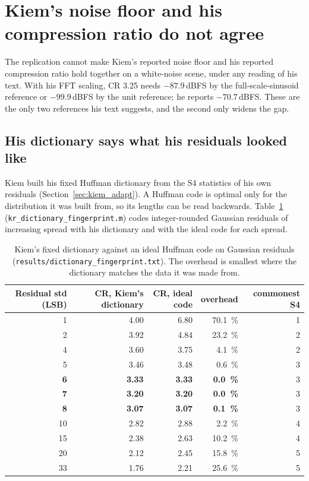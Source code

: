 \section{Kiem's noise floor and his compression ratio do not agree}
\label{sec:kr_nfcr}

The replication cannot make Kiem's reported noise floor and his reported
compression ratio hold together on a white-noise scene, under any reading of
his text. With his FFT scaling, CR 3.25 needs $-87.9$\,dBFS by the
full-scale-sinusoid reference or $-99.9$\,dBFS by the unit reference; he
reports $-70.7$\,dBFS. These are the only two references his text suggests, and
the second only widens the gap.

\subsection{His dictionary says what his residuals looked like}
\label{sec:kr_fingerprint}

Kiem built his fixed Huffman dictionary from the S4 statistics of his own
residuals (Section~\ref{sec:kiem_adapt}). A Huffman code is optimal only for
the distribution it was built from, so its lengths can be read backwards.
Table~\ref{tab:kr_fp} (\texttt{kr\_dictionary\_fingerprint.m}) codes
integer-rounded Gaussian residuals of increasing spread with his dictionary and
with the ideal code for each spread.

\begin{table}[htbp]
\centering
\caption[What Kiem's dictionary was built for]{Kiem's fixed dictionary
against an ideal Huffman code on Gaussian residuals
(\texttt{results/dictionary\_fingerprint.txt}). The overhead is smallest where
the dictionary matches the data it was made from.}
\label{tab:kr_fp}
\small
\begin{tabular}{@{}rrrrr@{}}
\toprule
Residual std (LSB) & CR, Kiem's dictionary & CR, ideal code & overhead & commonest S4\\
\midrule
1   & 4.00 & 6.80 & \SI{70.1}{\percent} & 1\\
2   & 3.92 & 4.84 & \SI{23.2}{\percent} & 2\\
4   & 3.60 & 3.75 & \SI{4.1}{\percent}  & 2\\
5   & 3.46 & 3.48 & \SI{0.6}{\percent}  & 3\\
\textbf{6}   & \textbf{3.33} & \textbf{3.33} & \textbf{\SI{0.0}{\percent}}  & 3\\
\textbf{7}   & \textbf{3.20} & \textbf{3.20} & \textbf{\SI{0.0}{\percent}}  & 3\\
\textbf{8}   & \textbf{3.07} & \textbf{3.07} & \textbf{\SI{0.1}{\percent}}  & 3\\
10  & 2.82 & 2.88 & \SI{2.2}{\percent}  & 4\\
15  & 2.38 & 2.63 & \SI{10.2}{\percent} & 4\\
20  & 2.12 & 2.45 & \SI{15.8}{\percent} & 5\\
33  & 1.76 & 2.21 & \SI{25.6}{\percent} & 5\\
\bottomrule
\end{tabular}
\end{table}

